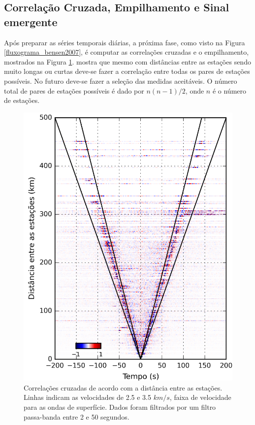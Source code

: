 \subsection{Correlação Cruzada, Empilhamento e  Sinal emergente}

Após preparar as séries temporais diárias, a próxima fase, como visto na Figura \ref{fluxograma_bensen2007}, é computar as correlações cruzadas e o empilhamento, mostrados na Figura \ref{correlacao_cruzada}. \cite{bensen_processing_2007} mostra que mesmo com distâncias entre as estações sendo muito longas ou curtas deve-se fazer a correlação entre todas os pares de estações possíveis. No futuro deve-se fazer a seleção das medidas aceitáveis. O número total de pares de estações possíveis é dado por $n(n-1)/2$, onde $n$ é o número de estações.

\begin{figure}[!ht]
\centering
\includegraphics[scale=0.2]{Figs/correlaca_cruzada.png}
\caption[Correlações cruzadas de acordo com a distância entre as estações utilizadas neste trabalho, Tabela \ref{tabelaDATAcorr} (Anexo 3).]{Correlações cruzadas de acordo com a distância entre as estações. Linhas indicam as velocidades de 2.5 e 3.5 $km/s$, faixa de velocidade para as ondas de superfície. Dados foram filtrados por um filtro passa-banda entre 2 e 50 segundos.}
\label{correlacao_cruzada}
\end{figure} 

